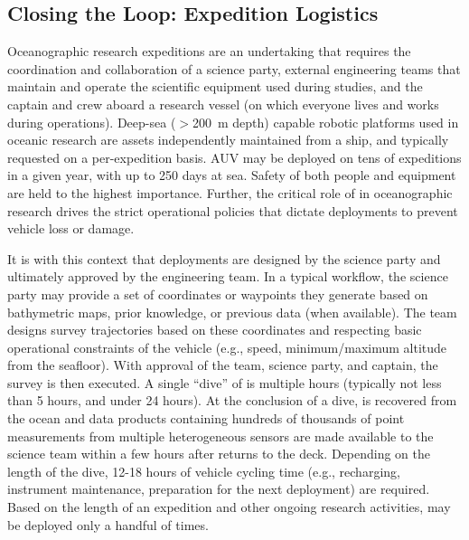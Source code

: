 \subsection{Closing the Loop: Expedition Logistics}
Oceanographic research expeditions are an undertaking that requires the coordination and collaboration of a science party, external engineering teams that maintain and operate the scientific equipment used during studies, and the captain and crew aboard a research vessel (on which everyone lives and works during operations). Deep-sea ($>$\SI{200}{\meter} depth) capable robotic platforms used in oceanic research are assets independently maintained from a ship, and typically requested on a per-expedition basis. AUV \Sentry may be deployed on tens of expeditions in a given year, with up to 250 days at sea\autocite{kaiser2016design}. Safety of both people and equipment are held to the highest importance. Further, the critical role of \Sentry in oceanographic research drives the strict operational policies that dictate \Sentry deployments to prevent vehicle loss or damage.

It is with this context that \Sentry deployments are designed by the science party and ultimately approved by the \Sentry engineering team. In a typical workflow, the science party may provide a set of coordinates or waypoints they generate based on bathymetric maps, prior knowledge, or previous data (when available). The \Sentry team designs survey trajectories based on these coordinates and respecting basic operational constraints of the vehicle (e.g., speed, minimum/maximum altitude from the seafloor). With approval of the \Sentry team, science party, and captain, the survey is then executed. A single ``dive'' of \Sentry is multiple hours (typically not less than 5 hours, and under 24 hours). At the conclusion of a dive, \Sentry is recovered from the ocean and data products containing hundreds of thousands of point measurements from multiple heterogeneous sensors are made available to the science team within a few hours after \Sentry returns to the deck. Depending on the length of the dive, 12-18 hours of vehicle cycling time (e.g., recharging, instrument maintenance, preparation for the next deployment) are required. Based on the length of an expedition and other ongoing research activities, \Sentry may be deployed only a handful of times.

